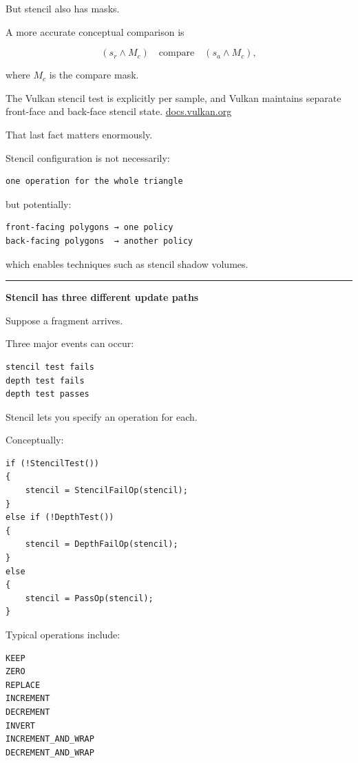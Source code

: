 But stencil also has masks.

A more accurate conceptual comparison is

\[
(s_r \land M_c)
\quad\text{compare}\quad
(s_a \land M_c),
\]

where \(M_c\) is the compare mask.

The Vulkan stencil test is explicitly per sample, and Vulkan maintains separate front-face and back-face stencil state. \href{https://docs.vulkan.org/spec/latest/chapters/fragops.html?utm_source=chatgpt.com}{docs.vulkan.org}

That last fact matters enormously.

Stencil configuration is not necessarily:

\begin{verbatim}
one operation for the whole triangle
\end{verbatim}

but potentially:

\begin{verbatim}
front-facing polygons → one policy
back-facing polygons  → another policy
\end{verbatim}

which enables techniques such as stencil shadow volumes.

\begin{center}\rule{0.5\linewidth}{0.5pt}\end{center}

\textbf{Stencil has three different update paths}

Suppose a fragment arrives.

Three major events can occur:

\begin{verbatim}
stencil test fails
depth test fails
depth test passes
\end{verbatim}

Stencil lets you specify an operation for each.

Conceptually:

\begin{verbatim}
if (!StencilTest())
{
    stencil = StencilFailOp(stencil);
}
else if (!DepthTest())
{
    stencil = DepthFailOp(stencil);
}
else
{
    stencil = PassOp(stencil);
}
\end{verbatim}

Typical operations include:

\begin{verbatim}
KEEP
ZERO
REPLACE
INCREMENT
DECREMENT
INVERT
INCREMENT_AND_WRAP
DECREMENT_AND_WRAP
\end{verbatim}

